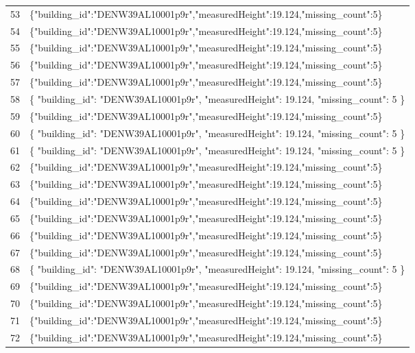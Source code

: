 \documentclass[a4paper,11pt]{article}
\begin{document}
\begin{table}[ht]
\begin{tabular}{r p{12cm}}
53 & \{"building\_id":"DENW39AL10001p9r","measuredHeight":19.124,"missing\_count":5\} \\
54 & \{"building\_id":"DENW39AL10001p9r","measuredHeight":19.124,"missing\_count":5\} \\
55 & \{"building\_id":"DENW39AL10001p9r","measuredHeight":19.124,"missing\_count":5\} \\
56 & \{"building\_id":"DENW39AL10001p9r","measuredHeight":19.124,"missing\_count":5\} \\
57 & \{"building\_id":"DENW39AL10001p9r","measuredHeight":19.124,"missing\_count":5\} \\
58 & \{
  "building\_id": "DENW39AL10001p9r",
  "measuredHeight": 19.124,
  "missing\_count": 5
\} \\
59 & \{"building\_id":"DENW39AL10001p9r","measuredHeight":19.124,"missing\_count":5\} \\
60 & \{
  "building\_id": "DENW39AL10001p9r",
  "measuredHeight": 19.124,
  "missing\_count": 5
\} \\
61 & \{
  "building\_id": "DENW39AL10001p9r",
  "measuredHeight": 19.124,
  "missing\_count": 5
\} \\
62 & \{"building\_id":"DENW39AL10001p9r","measuredHeight":19.124,"missing\_count":5\} \\
63 & \{"building\_id":"DENW39AL10001p9r","measuredHeight":19.124,"missing\_count":5\} \\
64 & \{"building\_id":"DENW39AL10001p9r","measuredHeight":19.124,"missing\_count":5\} \\
65 & \{"building\_id":"DENW39AL10001p9r","measuredHeight":19.124,"missing\_count":5\} \\
66 & \{"building\_id":"DENW39AL10001p9r","measuredHeight":19.124,"missing\_count":5\} \\
67 & \{"building\_id":"DENW39AL10001p9r","measuredHeight":19.124,"missing\_count":5\} \\
68 & \{
  "building\_id": "DENW39AL10001p9r",
  "measuredHeight": 19.124,
  "missing\_count": 5
\} \\
69 & \{"building\_id":"DENW39AL10001p9r","measuredHeight":19.124,"missing\_count":5\} \\
70 & \{"building\_id":"DENW39AL10001p9r","measuredHeight":19.124,"missing\_count":5\} \\
71 & \{"building\_id":"DENW39AL10001p9r","measuredHeight":19.124,"missing\_count":5\} \\
72 & \{"building\_id":"DENW39AL10001p9r","measuredHeight":19.124,"missing\_count":5\} \\

\end{tabular}
\end{table}
\end{document}
